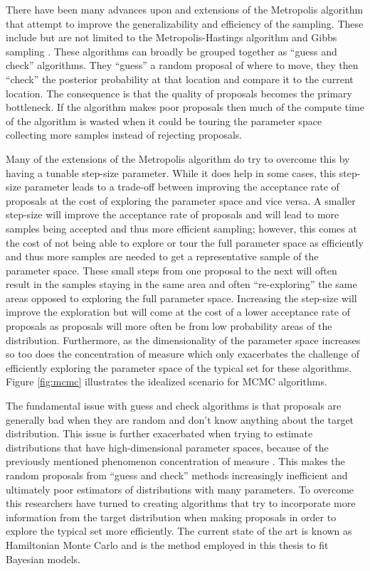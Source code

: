 There have been many advances upon and extensions of the Metropolis algorithm that attempt to improve the generalizability and efficiency of the sampling. These include but are not limited to the Metropolis-Hastings algorithm and Gibbs sampling \cite{Hastings1970} \cite{German1984}. These algorithms can broadly be grouped together as ``guess and check'' algorithms. They ``guess'' a random proposal of where to move, they then ``check'' the posterior probability at that location and compare it to the current location. The consequence is that the quality of proposals becomes the primary bottleneck. If the algorithm makes poor proposals then much of the compute time of the algorithm is wasted when it could be touring the parameter space collecting more samples instead of rejecting proposals.

Many of the extensions of the Metropolis algorithm do try to overcome this by having a tunable step-size parameter. While it does help in some cases, this step-size parameter leads to a trade-off between improving the acceptance rate of proposals at the cost of exploring the parameter space and vice versa. A smaller step-size will improve the acceptance rate of proposals and will lead to more samples being accepted and thus more efficient sampling; however, this comes at the cost of not being able to explore or tour the full parameter space as efficiently and thus more samples are needed to get a representative sample of the parameter space. These small steps from one proposal to the next will often result in the samples staying in the same area and often ``re-exploring'' the same areas opposed to exploring the full parameter space. Increasing the step-size will improve the exploration but will come at the cost of a lower acceptance rate of proposals as proposals will more often be from low probability areas of the distribution. Furthermore, as the dimensionality of the parameter space increases so too does the concentration of measure which only exacerbates the challenge of efficiently exploring the parameter space of the typical set for these algorithms. Figure \ref{fig:mcmc} illustrates the idealized scenario for MCMC algorithms.

The fundamental issue with guess and check algorithms is that proposals are generally bad when they are random and don't know anything about the target distribution. This issue is further exacerbated when trying to estimate distributions that have high-dimensional parameter spaces, because of the previously mentioned phenomenon concentration of measure \cite{Betancourt2017} \cite{Carpenter2017}. This makes the random proposals from ``guess and check'' methods increasingly inefficient and ultimately poor estimators of distributions with many parameters. To overcome this researchers have turned to creating algorithms that try to incorporate more information from the target distribution when making proposals in order to explore the typical set more efficiently. The current state of the art is known as Hamiltonian Monte Carlo and is the method employed in this thesis to fit Bayesian models.

